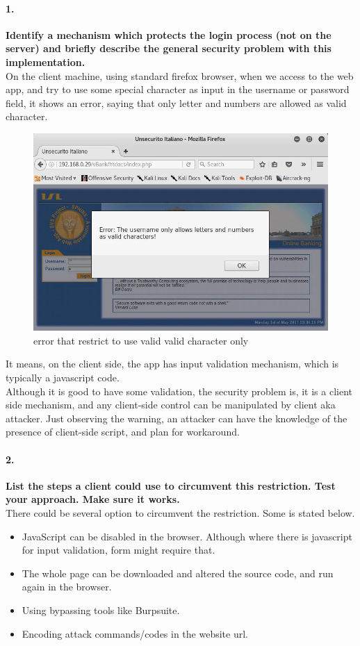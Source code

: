 \documentclass[12pt]{report}
\begin{document}
	\paragraph*{1.} {\bf Identify a mechanism which protects the login process (not on the server) and briefly describe the general security problem with this implementation.}\\
	
	On the client machine, using standard firefox browser, when we access to the web app, and try to use some special character as input in the username or password field, it shows an error, saying that only letter and numbers are allowed as valid character.

	\begin{figure}[H]
		\includegraphics[width=0.75\textheight]{images/javascripterror.jpg}
		\caption{error that restrict to use valid valid character only}
	\end{figure}
	
	It means, on the client side, the app has input validation mechanism, which is typically a javascript code.\\
	Although it is good to have some validation, the security problem is, it is a client side mechanism, and any client-side control can be manipulated by client aka attacker. Just observing the warning, an attacker can have the knowledge of the presence of client-side script, and plan for workaround.
	
	\paragraph*{2.} {\bf List the steps a client could use to circumvent this restriction. Test your approach. Make sure it works.}\\
	There could be several option to circumvent the restriction. Some is stated below.
	\begin{itemize}
		\item JavaScript can be disabled in the browser. Although where there is javascript for input validation, form might require that.
		\item The whole page can be downloaded and altered the source code, and run again in the browser.
		\item Using bypassing tools like Burpsuite.
		\item Encoding attack commands/codes in the website url.
	\end{itemize}
\end{document}
